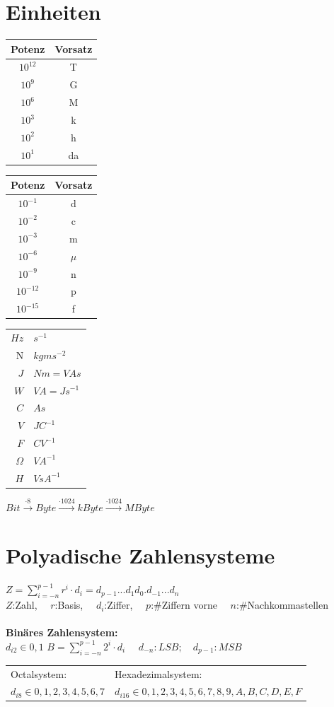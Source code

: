 \documentclass[6pt,a4paper]{scrartcl}
\begin{document}
\begin{multicols*}{3}
\section{Einheiten}
\begin{multicols}{3}
\begin{tabular}{c | c}
	Potenz & Vorsatz \\ \midrule
	$10^{12}$ & T \\
	$10^{9}$ & G \\
	$10^{6}$ & M \\
	$10^{3}$ & k \\
	$10^{2}$ & h \\
	$10^{1}$ & da 
\end{tabular}
\begin{tabular}{c | c}
	Potenz & Vorsatz \\ \midrule
	$10^{-1}$ & d \\
	$10^{-2}$ & c \\
	$10^{-3}$ & m \\
	$10^{-6}$ & $\mu$	\\
	$10^{-9}$ & n \\
	$10^{-12}$ & p \\
	$10^{-15}$ & f
\end{tabular}
\begin{tabular}{ r | l }
$Hz$ & $s^{-1}$ \\
N & $kg m s^{-2} $ \\
$J $ & $ N m = V A s$\\
$W $ & $ V A  = J s^{-1} $ \\
$ C $ & $ A s $ \\
$V $ & $ J C^{-1} $\\
$F $ & $ C V^{-1} $ \\
$\Omega $ & $ V A^{-1} $\\
$ H $ & $ V s  A^{-1}$
\end{tabular}
\end{multicols}
$Bit \xrightarrow{\cdot 8} Byte \xrightarrow{\cdot 1024} kByte \xrightarrow{\cdot 1024} MByte$\\

\section{Polyadische Zahlensysteme}
$Z = \sum\limits^{p-1}_{i = -n} r^i \cdot d_i = d_{p-1}...d_1 d_0 . d_{-1} ... d_n$\\
$Z$:Zahl, \ \ $r$:Basis, \ \ $d_i$:Ziffer, \ \ $p$:\#Ziffern vorne \ \ $n$:\#Nachkommastellen\\\\
\textbf{Binäres Zahlensystem:}\\
$d_{i2} \in {0,1}$ \qquad
$B = \sum\limits_{i=-n}^{p-1} 2^i \cdot d_i$ $\quad d_{-n}: LSB; \quad d_{p-1}: MSB$ \\
\begin{tabular}{l|l}
Octalsystem: & Hexadezimalsystem:\\
$d_{i8} \in {0,1,2,3,4,5,6,7}$ & $d_{i16} \in {0,1,2,3,4,5,6,7,8,9,A,B,C,D,E,F}$\\
\end{tabular}\\
\\


\end{multicols*}
\end{document}
